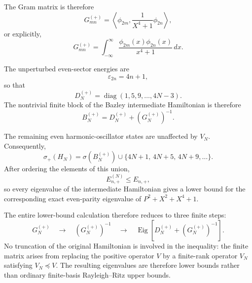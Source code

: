 \documentclass{article}
\theoremstyle{definition}
\begin{document}
The Gram matrix is therefore
\begin{equation}
    \boxed{
    G^{(+)}_{mn}
    =
    \left\langle
    \phi_{2m},
    \frac{1}{X^4+1}
    \phi_{2n}
    \right\rangle ,
    }
    \label{eq:quartic-G}
\end{equation}
or explicitly,
\begin{equation}
    G^{(+)}_{mn}
    =
    \int_{-\infty}^{\infty}
    \frac{
    \phi_{2m}(x)\phi_{2n}(x)
    }{x^4+1}\,dx .
    \label{eq:quartic-G-integral}
\end{equation}

The unperturbed even-sector energies are
\begin{equation}
    \varepsilon_{2n}=4n+1,
\end{equation}
so that
\begin{equation}
    D_N^{(+)}
    =
    \operatorname{diag}
    (1,5,9,\ldots,4N-3).
\end{equation}
The nontrivial finite block of the Bazley intermediate Hamiltonian is
therefore
\begin{equation}
    \boxed{
    B_N^{(+)}
    =
    D_N^{(+)}
    +
    \left(G_N^{(+)}\right)^{-1}.
    }
    \label{eq:quartic-BF-matrix}
\end{equation}

The remaining even harmonic-oscillator states are unaffected by
\(V_N\).  Consequently,
\begin{equation}
    \sigma_{+}(H_N)
    =
    \sigma\!\left(B_N^{(+)}\right)
    \cup
    \{4N+1,\,4N+5,\,4N+9,\ldots\}.
    \label{eq:quartic-full-spectrum}
\end{equation}
After ordering the elements of this union,
\begin{equation}
    E_{n,+}^{(N)}
    \leq
    E_{n,+},
\end{equation}
so every eigenvalue of the intermediate Hamiltonian gives a lower
bound for the corresponding exact even-parity eigenvalue of
\(P^2+X^2+X^4+1\).

The entire lower-bound calculation therefore reduces to three finite
steps:
\begin{equation}
    G_N^{(+)}
    \quad\longrightarrow\quad
    \left(G_N^{(+)}\right)^{-1}
    \quad\longrightarrow\quad
    \operatorname{Eig}
    \left[
    D_N^{(+)}
    +
    \left(G_N^{(+)}\right)^{-1}
    \right].
\end{equation}
No truncation of the original Hamiltonian is involved in the
inequality: the finite matrix arises from replacing the positive
operator \(V\) by a finite-rank operator \(V_N\) satisfying
\(V_N\preceq V\).  The resulting eigenvalues are therefore lower
bounds rather than ordinary finite-basis Rayleigh--Ritz upper bounds.
\end{document}
